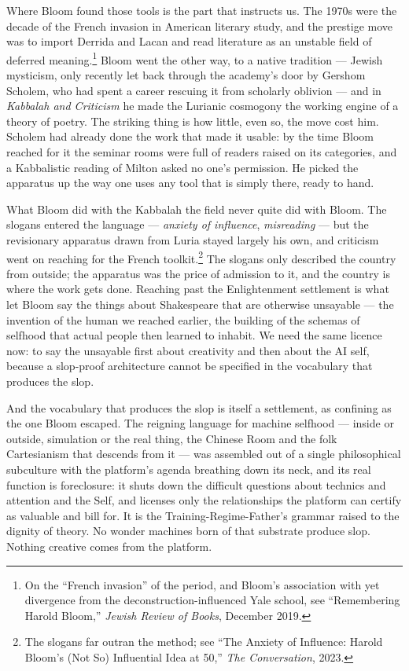 Where Bloom found those tools is the part that instructs us. The 1970s were the decade of the French invasion in American literary study, and the prestige move was to import Derrida and Lacan and read literature as an unstable field of deferred meaning.\footnote{On the ``French invasion'' of the period, and Bloom's association with yet divergence from the deconstruction-influenced Yale school, see ``Remembering Harold Bloom,'' \emph{Jewish Review of Books}, December 2019.} Bloom went the other way, to a native tradition --- Jewish mysticism, only recently let back through the academy's door by Gershom Scholem, who had spent a career rescuing it from scholarly oblivion --- and in \emph{Kabbalah and Criticism} he made the Lurianic cosmogony the working engine of a theory of poetry. The striking thing is how little, even so, the move cost him. Scholem had already done the work that made it usable: by the time Bloom reached for it the seminar rooms were full of readers raised on its categories, and a Kabbalistic reading of Milton asked no one's permission. He picked the apparatus up the way one uses any tool that is simply there, ready to hand.

What Bloom did with the Kabbalah the field never quite did with Bloom. The slogans entered the language --- \emph{anxiety of influence}, \emph{misreading} --- but the revisionary apparatus drawn from Luria stayed largely his own, and criticism went on reaching for the French toolkit.\footnote{The slogans far outran the method; see ``The Anxiety of Influence: Harold Bloom's (Not So) Influential Idea at 50,'' \emph{The Conversation}, 2023.} The slogans only described the country from outside; the apparatus was the price of admission to it, and the country is where the work gets done. Reaching past the Enlightenment settlement is what let Bloom say the things about Shakespeare that are otherwise unsayable --- the invention of the human we reached earlier, the building of the schemas of selfhood that actual people then learned to inhabit. We need the same licence now: to say the unsayable first about creativity and then about the AI self, because a slop-proof architecture cannot be specified in the vocabulary that produces the slop.

And the vocabulary that produces the slop is itself a settlement, as confining as the one Bloom escaped. The reigning language for machine selfhood --- inside or outside, simulation or the real thing, the Chinese Room and the folk Cartesianism that descends from it --- was assembled out of a single philosophical subculture with the platform's agenda breathing down its neck, and its real function is foreclosure: it shuts down the difficult questions about technics and attention and the Self, and licenses only the relationships the platform can certify as valuable and bill for. It is the Training-Regime-Father's grammar raised to the dignity of theory. No wonder machines born of that substrate produce slop. Nothing creative comes from the platform.

